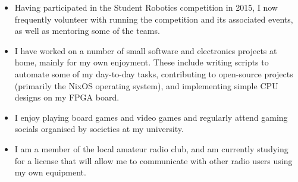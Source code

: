 
\begin{itemize}
  \item Having participated in the Student Robotics competition in 2015, I now frequently volunteer with running the competition and its associated events, as well as mentoring some of the teams.
  \item I have worked on a number of small software and electronics projects at home, mainly for my own enjoyment. These include writing scripts to automate some of my day-to-day tasks, contributing to open-source projects (primarily the NixOS operating system), and implementing simple CPU designs on my FPGA board.
  \item I enjoy playing board games and video games and regularly attend gaming socials organised by societies at my university.
  \item I am a member of the local amateur radio club, and am currently studying for a license that will allow me to communicate with other radio users using my own equipment.
\end{itemize}
